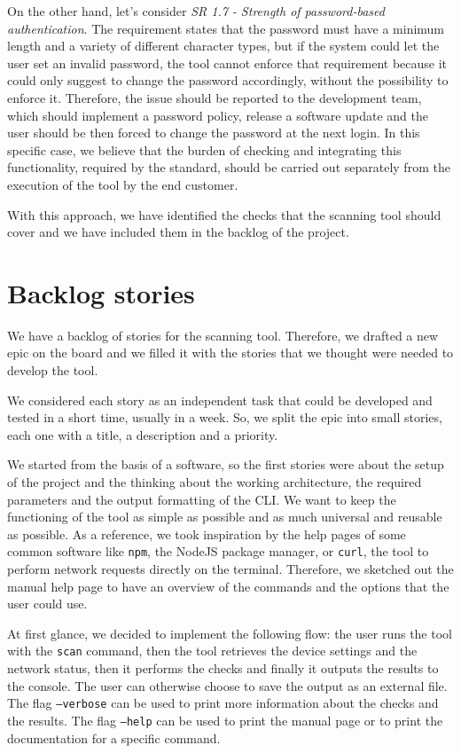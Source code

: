 On the other hand, let's consider \textit{SR 1.7 - Strength of password-based authentication}. The requirement states that the password must have a minimum length and a variety of different character types, but if the system could let the user set an invalid password, the tool cannot enforce that requirement because it could only suggest to change the password accordingly, without the possibility to enforce it. Therefore, the issue should be reported to the development team, which should implement a password policy, release a software update and the user should be then forced to change the password at the next login. In this specific case, we believe that the burden of checking and integrating this functionality, required by the standard, should be carried out separately from the execution of the tool by the end customer.

With this approach, we have identified the checks that the scanning tool should cover and we have included them in the backlog of the project.

\section{Backlog stories}

We have a backlog of stories for the scanning tool. Therefore, we drafted a new epic on the board and we filled it with the stories that we thought were needed to develop the tool.

We considered each story as an independent task that could be developed and tested in a short time, usually in a week. So, we split the epic into small stories, each one with a title, a description and a priority.

We started from the basis of a software, so the first stories were about the setup of the project and the thinking about the working architecture, the required parameters and the output formatting of the CLI. We want to keep the functioning of the tool as simple as possible and as much universal and reusable as possible. As a reference, we took inspiration by the help pages of some common software like \texttt{npm}, the NodeJS package manager, or \texttt{curl}, the tool to perform network requests directly on the terminal. Therefore, we sketched out the manual help page to have an overview of the commands and the options that the user could use.

At first glance, we decided to implement the following flow: the user runs the tool with the \texttt{scan} command, then the tool retrieves the device settings and the network status, then it performs the checks and finally it outputs the results to the console. The user can otherwise choose to save the output as an external file. The flag \texttt{--verbose} can be used to print more information about the checks and the results. The flag \texttt{--help} can be used to print the manual page or to print the documentation for a specific command.

